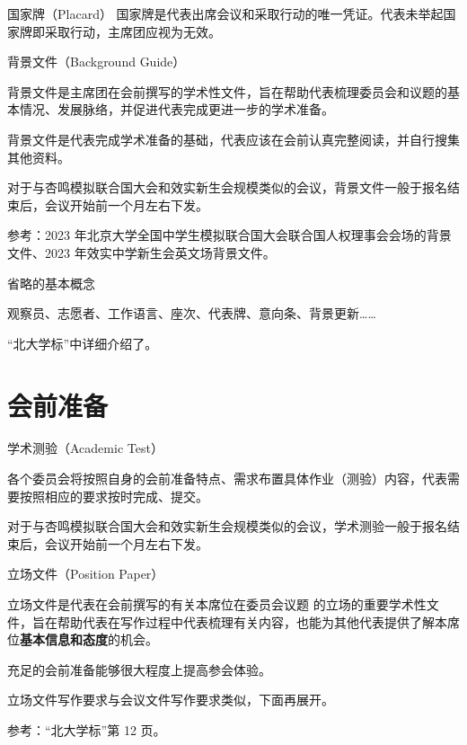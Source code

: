 \documentclass{beamer}
\begin{document}
\begin{frame}{国家牌（Placard）}
国家牌是代表出席会议和采取行动的唯一凭证。代表未举起国家牌即采取行动，主席团应视为无效。

\end{frame}

\begin{frame}{背景文件（Background Guide）}
    
背景文件是主席团在会前撰写的学术性文件，旨在帮助代表梳理委员会和议题的基本情况、发展脉络，并促进代表完成更进一步的学术准备。

背景文件是代表完成学术准备的基础，代表应该在会前认真完整阅读，并自行搜集其他资料。

对于与杏鸣模拟联合国大会和效实新生会规模类似的会议，背景文件一般于报名结束后，会议开始前一个月左右下发。

参考：2023 年北京大学全国中学生模拟联合国大会联合国人权理事会会场的背景文件、2023 年效实中学新生会英文场背景文件。

\end{frame}

\begin{frame}{省略的基本概念}

观察员、志愿者、工作语言、座次、代表牌、意向条、背景更新……

“北大学标”中详细介绍了。

\end{frame}


\section{会前准备}

\begin{frame}{学术测验（Academic Test）}

各个委员会将按照自身的会前准备特点、需求布置具体作业（测验）内容，代表需要按照相应的要求按时完成、提交。

对于与杏鸣模拟联合国大会和效实新生会规模类似的会议，学术测验一般于报名结束后，会议开始前一个月左右下发。
    
\end{frame}

\begin{frame}{立场文件（Position Paper）}

立场文件是代表在会前撰写的有关本席位在委员会议题 的立场的重要学术性文件，旨在帮助代表在写作过程中代表梳理有关内容，也能为其他代表提供了解本席位\textbf{基本信息和态度}的机会。

充足的会前准备能够很大程度上提高参会体验。

立场文件写作要求与会议文件写作要求类似，下面再展开。

参考：“北大学标”第 12 页。

\end{frame}
\end{document}
